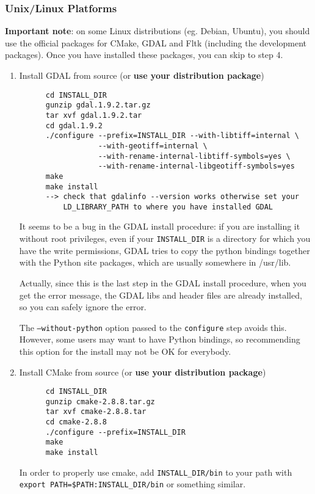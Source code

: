 \subsubsection{Unix/Linux Platforms}

\textbf{Important note}: on some Linux distributions (eg. Debian, Ubuntu), you should use
the official packages for CMake, GDAL and Fltk (including the development packages). Once you have installed these
packages, you can skip to step 4.

\begin{enumerate}

\item Install GDAL from source (or \textbf{use your distribution package})
  \begin{verbatim}
      cd INSTALL_DIR
      gunzip gdal.1.9.2.tar.gz
      tar xvf gdal.1.9.2.tar
      cd gdal.1.9.2
      ./configure --prefix=INSTALL_DIR --with-libtiff=internal \
                  --with-geotiff=internal \
                  --with-rename-internal-libtiff-symbols=yes \
                  --with-rename-internal-libgeotiff-symbols=yes
      make
      make install
      --> check that gdalinfo --version works otherwise set your
          LD_LIBRARY_PATH to where you have installed GDAL
  \end{verbatim}

It seems to be a bug in the GDAL install procedure: if you are installing it without root privileges, even if your \texttt{INSTALL\_DIR} is a directory for which you have the write permissions, GDAL tries to copy the python bindings together with the Python site packages, which are usually somewhere in /usr/lib.

Actually, since this is the last step in the GDAL install procedure, when you get the error message, the GDAL libs and header files are already installed, so you can safely ignore the error.

The \texttt{--without-python} option passed to the \texttt{configure} step avoids this. However, some users may want to have Python bindings, so recommending this option for the install may not be OK for everybody.

\item Install CMake from source (or \textbf{use your distribution package})
  \begin{verbatim}
      cd INSTALL_DIR
      gunzip cmake-2.8.8.tar.gz
      tar xvf cmake-2.8.8.tar
      cd cmake-2.8.8
      ./configure --prefix=INSTALL_DIR
      make
      make install
  \end{verbatim}
      In order to properly use cmake, add \texttt{INSTALL\_DIR/bin} to
      your path with \texttt{export PATH=\$PATH:INSTALL\_DIR/bin} or
      something similar.


\end{enumerate}
